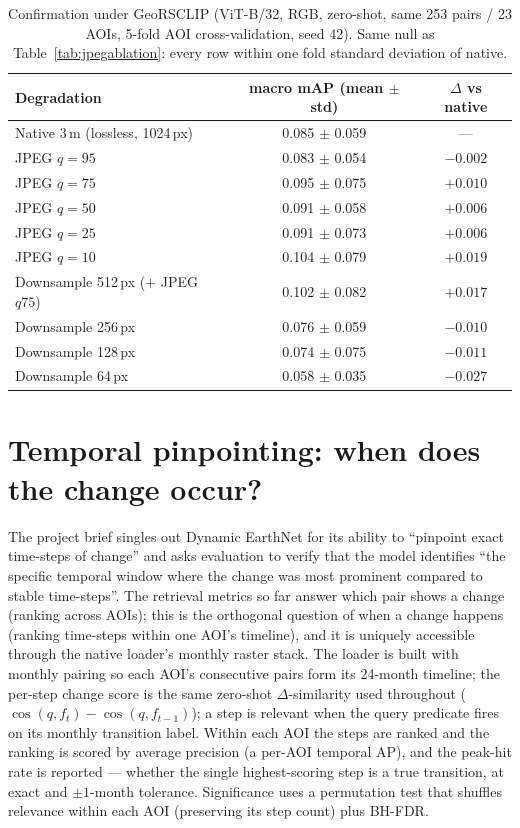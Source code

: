 \documentclass{article}
\begin{document}
\begin{appendices}
\begin{table}[H]
    \centering
    \caption{Confirmation under GeoRSCLIP (ViT-B/32, RGB, zero-shot, same 253
    pairs / 23 AOIs, 5-fold AOI cross-validation, seed 42). Same null as
    Table~\ref{tab:jpegablation}: every row within one fold standard deviation of
    native.}
    \label{tab:jpegablationgeors}
    \begin{tabular}{lcc}
        \toprule
        \textbf{Degradation} & \textbf{macro mAP (mean $\pm$ std)} & \textbf{$\Delta$ vs native} \\
        \midrule
        Native 3\,m (lossless, 1024\,px) & 0.085 $\pm$ 0.059 & --- \\
        \midrule
        JPEG $q{=}95$  & 0.083 $\pm$ 0.054 & $-0.002$ \\
        JPEG $q{=}75$  & 0.095 $\pm$ 0.075 & $+0.010$ \\
        JPEG $q{=}50$  & 0.091 $\pm$ 0.058 & $+0.006$ \\
        JPEG $q{=}25$  & 0.091 $\pm$ 0.073 & $+0.006$ \\
        JPEG $q{=}10$  & 0.104 $\pm$ 0.079 & $+0.019$ \\
        \midrule
        Downsample 512\,px ($+$ JPEG $q75$) & 0.102 $\pm$ 0.082 & $+0.017$ \\
        Downsample 256\,px & 0.076 $\pm$ 0.059 & $-0.010$ \\
        Downsample 128\,px & 0.074 $\pm$ 0.075 & $-0.011$ \\
        Downsample \phantom{0}64\,px & 0.058 $\pm$ 0.035 & $-0.027$ \\
        \bottomrule
    \end{tabular}
\end{table}

\clearpage
\section{Temporal pinpointing: when does the change occur?}
\label{sec:temporalpinpoint}

The project brief singles out Dynamic EarthNet for its ability to ``pinpoint exact
time-steps of change'' and asks evaluation to verify that the model identifies ``the
specific temporal window where the change was most prominent compared to stable
time-steps''. The retrieval metrics so far answer which pair shows a change (ranking
across AOIs); this is the orthogonal question of when a change happens (ranking
time-steps within one AOI's timeline), and it is uniquely accessible through the
native loader's monthly raster stack. The loader is built with monthly pairing so
each AOI's consecutive pairs form its 24-month timeline; the per-step change score
is the same zero-shot $\Delta$-similarity used throughout
($\cos(q,f_t)-\cos(q,f_{t-1})$); a step is relevant when the query predicate fires
on its monthly transition label. Within each AOI the steps are ranked and the
ranking is scored by average precision (a per-AOI temporal AP), and the peak-hit
rate is reported --- whether the single highest-scoring step is a true transition,
at exact and $\pm1$-month tolerance. Significance uses a permutation test that
shuffles relevance within each AOI (preserving its step count) plus BH-FDR.


\end{appendices}
\end{document}
